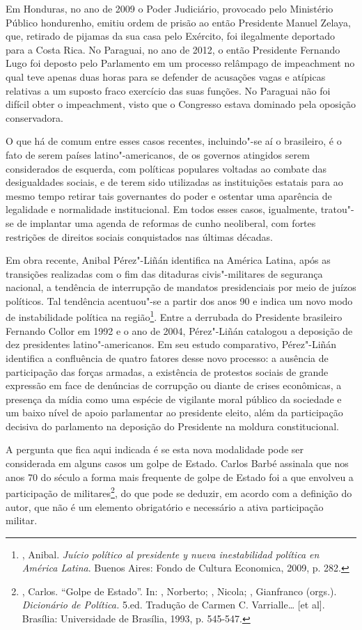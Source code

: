 Em Honduras, no ano de 2009 o Poder Judiciário, provocado pelo
Ministério Público hondurenho, emitiu ordem de prisão ao então
Presidente Manuel Zelaya, que, retirado de pijamas da sua casa pelo
Exército, foi ilegalmente deportado para a Costa Rica. No Paraguai, no
ano de 2012, o então Presidente Fernando Lugo foi deposto pelo Parlamento
em um processo relâmpago de impeachment no qual teve apenas duas horas
para se defender de acusações vagas e atípicas relativas a um suposto
fraco exercício das suas funções. No Paraguai não foi difícil obter o
impeachment, visto que o Congresso estava dominado pela oposição
conservadora.

O que há de comum entre esses casos recentes, incluindo"-se aí o
brasileiro, é o fato de serem países latino"-americanos, de os governos
atingidos serem considerados de esquerda, com políticas populares
voltadas ao combate das desigualdades sociais, e de terem sido
utilizadas as instituições estatais para ao mesmo tempo retirar tais
governantes do poder e ostentar uma aparência de legalidade e
normalidade institucional. Em todos esses casos, igualmente, tratou"-se
de implantar uma agenda de reformas de cunho neoliberal, com fortes
restrições de direitos sociais conquistados nas últimas décadas.

Em obra recente, Anibal Pérez"-Liñán identifica na América Latina, após
as transições realizadas com o fim das ditaduras civis"-militares de
segurança nacional, a tendência de interrupção de mandatos presidenciais
por meio de juízos políticos. Tal tendência acentuou"-se a partir dos
anos 90 e indica um novo modo de instabilidade política na
região\footnote{, Anibal. \emph{Juício político al
  presidente y nueva inestabilidad política en América Latina}. Buenos
  Aires: Fondo de Cultura Economica, 2009, p. 282.}. Entre a derrubada do
Presidente brasileiro Fernando Collor em 1992 e o ano de 2004,
Pérez"-Liñán catalogou a deposição de dez presidentes latino"-americanos.
Em seu estudo comparativo, Pérez"-Liñán identifica a confluência de
quatro fatores desse novo processo: a ausência de participação das
forças armadas, a existência de protestos sociais de grande expressão em
face de denúncias de corrupção ou diante de crises econômicas, a
presença da mídia como uma espécie de vigilante moral público da
sociedade e um baixo nível de apoio parlamentar ao presidente eleito,
além da participação decisiva do parlamento na deposição do Presidente
na moldura constitucional.

A pergunta que fica aqui indicada é se esta nova modalidade pode ser
considerada em alguns casos um golpe de Estado. Carlos Barbé assinala
que nos anos 70 do século  a forma mais frequente de golpe de Estado
foi a que envolveu a participação de militares\footnote{, Carlos.
  ``Golpe de Estado''. In: , Norberto; , Nicola; ,
  Gianfranco (orgs.). \emph{Dicionário de Política.} 5.ed. Tradução de
  Carmen C. Varrialle\ldots{} {[}et al{]}. Brasília: Universidade de
  Brasília, 1993, p. 545-547.}, do que pode se deduzir, em acordo com a
definição do autor, que não é um elemento obrigatório e necessário a
ativa participação militar.

